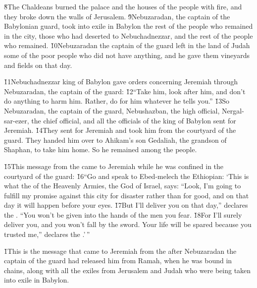 \v{8}The Chaldeans burned the palace and the houses of the people with fire, and they broke down the walls of Jerusalem. \v{9}Nebuzaradan, the captain of the Babylonian guard, took into exile in Babylon the rest of the people who remained in the city, those who had deserted to Nebuchadnezzar, and the rest of the people who remained. \v{10}Nebuzaradan the captain of the guard left in the land of Judah some of the poor people who did not have anything, and he gave them vineyards and fields on that day.

\v{11}Nebuchadnezzar king of Babylon gave orders concerning Jeremiah through Nebuzaradan, the captain of the guard: \v{12}``Take him, look after him, and don't do anything to harm him. Rather, do for him whatever he tells you.'' \v{13}So Nebuzaradan, the captain of the guard, Nebushazban, the high official, Nergal-sar-ezer, the chief official, and all the officials of the king of Babylon sent for Jeremiah. \v{14}They sent for Jeremiah and took him from the courtyard of the guard. They handed him over to Ahikam's son Gedaliah, the grandson of Shaphan, to take him home. So he remained among the people.

\v{15}This message from the  came to Jeremiah while he was confined in the courtyard of the guard: \v{16}``Go and speak to Ebed-melech the Ethiopian: `This is what the  of the Heavenly Armies, the God of Israel, says: ``Look, I'm going to fulfill my promise against this city for disaster rather than for good, and on that day it will happen before your eyes. \v{17}But I'll deliver you on that day,'' declares the . ``You won't be given into the hands of the men you fear. \v{18}For I'll surely deliver you, and you won't fall by the sword. Your life will be spared because you trusted me,'' declares the .'\,''

\v{1}This is the message that came to Jeremiah from the  after Nebuzaradan the captain of the guard had released him from Ramah, when he was bound in chains, along with all the exiles from Jerusalem and Judah who were being taken into exile in Babylon.

